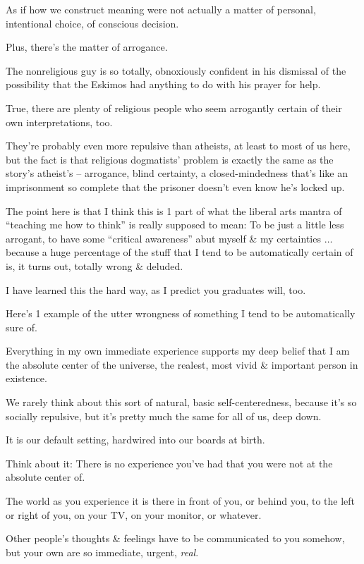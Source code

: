 \documentclass{article}
\begin{document}
As if how we construct meaning were not actually a matter of personal, intentional choice, of conscious decision.

Plus, there's the matter of arrogance.

The nonreligious guy is so totally, obnoxiously confident in his dismissal of the possibility that the Eskimos had anything to do with his prayer for help.

True, there are plenty of religious people who seem arrogantly certain of their own interpretations, too.

They're probably even more repulsive than atheists, at least to most of us here, but the fact is that religious dogmatists' problem is exactly the same as the story's atheist's -- arrogance, blind certainty, a closed-mindedness that's like an imprisonment so complete that the prisoner doesn't even know he's locked up.

The point here is that I think this is 1 part of what the liberal arts mantra of ``teaching me how to think'' is really supposed to mean: To be just a little less arrogant, to have some ``critical awareness'' abut myself \& my certainties $\ldots$ because a huge percentage of the stuff that I tend to be automatically certain of is, it turns out, totally wrong \& deluded.

I have learned this the hard way, as I predict you graduates will, too.

Here's 1 example of the utter wrongness of something I tend to be automatically sure of.

Everything in my own immediate experience supports my deep belief that I am the absolute center of the universe, the realest, most vivid \& important person in existence.

We rarely think about this sort of natural, basic self-centeredness, because it's so socially repulsive, but it's pretty much the same for all of us, deep down.

It is our default setting, hardwired into our boards at birth.

Think about it: There is no experience you've had that you were not at the absolute center of.

The world as you experience it is there in front of you, or behind you, to the left or right of you, on your TV, on your monitor, or whatever.

Other people's thoughts \& feelings have to be communicated to you somehow, but your own are so immediate, urgent, {\it real}.
\end{document}
